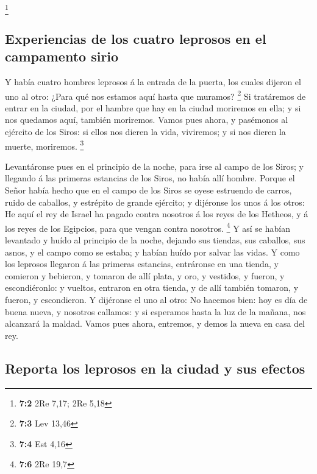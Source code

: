 \footnote{\textbf{7:2} 2Re 7,17; 2Re 5,18}

\hypertarget{experiencias-de-los-cuatro-leprosos-en-el-campamento-sirio}{%
\subsection{Experiencias de los cuatro leprosos en el campamento
sirio}\label{experiencias-de-los-cuatro-leprosos-en-el-campamento-sirio}}

 Y había cuatro hombres leprosos á la entrada de la
puerta, los cuales dijeron el uno al otro: ¿Para qué nos estamos aquí
hasta que muramos? \footnote{\textbf{7:3} Lev 13,46}  Si
tratáremos de entrar en la ciudad, por el hambre que hay en la ciudad
moriremos en ella; y si nos quedamos aquí, también moriremos. Vamos pues
ahora, y pasémonos al ejército de los Siros: si ellos nos dieren la
vida, viviremos; y si nos dieren la muerte, moriremos. \footnote{\textbf{7:4}
  Est 4,16}

 Levantáronse pues en el principio de la noche, para irse
al campo de los Siros; y llegando á las primeras estancias de los Siros,
no había allí hombre.  Porque el Señor había hecho que en
el campo de los Siros se oyese estruendo de carros, ruido de caballos, y
estrépito de grande ejército; y dijéronse los unos á los otros: He aquí
el rey de Israel ha pagado contra nosotros á los reyes de los Hetheos, y
á los reyes de los Egipcios, para que vengan contra nosotros.
\footnote{\textbf{7:6} 2Re 19,7}  Y así se habían
levantado y huído al principio de la noche, dejando sus tiendas, sus
caballos, sus asnos, y el campo como se estaba; y habían huído por
salvar las vidas.  Y como los leprosos llegaron á las
primeras estancias, entráronse en una tienda, y comieron y bebieron, y
tomaron de allí plata, y oro, y vestidos, y fueron, y escondiéronlo: y
vueltos, entraron en otra tienda, y de allí también tomaron, y fueron, y
escondieron.  Y dijéronse el uno al otro: No hacemos bien:
hoy es día de buena nueva, y nosotros callamos: y si esperamos hasta la
luz de la mañana, nos alcanzará la maldad. Vamos pues ahora, entremos, y
demos la nueva en casa del rey.

\hypertarget{reporta-los-leprosos-en-la-ciudad-y-sus-efectos}{%
\subsection{Reporta los leprosos en la ciudad y sus
efectos}\label{reporta-los-leprosos-en-la-ciudad-y-sus-efectos}}

